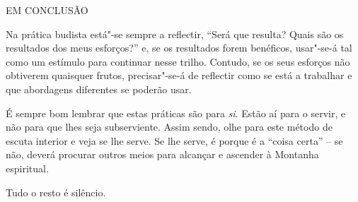 EM CONCLUSÃO

Na prática budista está"-se sempre a reflectir, ``Será que resulta? Quais
são os resultados dos meus esforços?'' e, se os resultados forem
benéficos, usar"-se-á tal como um estímulo para continuar nesse trilho.
Contudo, se os seus esforços não obtiverem quaisquer frutos,
precisar"-se-á de reflectir como se está a trabalhar e que abordagens
diferentes se poderão usar.

É sempre bom lembrar que estas práticas são para \emph{si}. Estão aí
para o servir, e não para que lhes seja subserviente. Assim sendo, olhe
para este método de escuta interior e veja se lhe serve. Se lhe serve, é
porque é a ``coisa certa'' -- se não, deverá procurar outros meios para
alcançar e ascender à Montanha espiritual.

Tudo o resto é silêncio.
